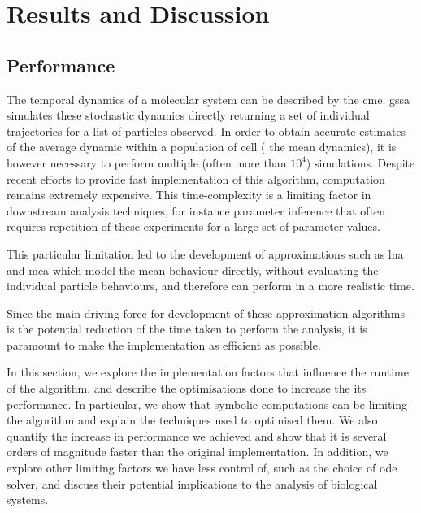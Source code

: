 \section{Results and Discussion} \label{results}



\subsection{Performance}\label{performance}
The temporal dynamics of a molecular system can be described by the \acrfull{cme}.
\acrfull{gssa}\cite{gillespie_general_1976} simulates these stochastic dynamics directly returning a set of individual trajectories for a list of particles observed.
In order to obtain accurate estimates of the average dynamic within a population of cell (\ie{} the mean dynamics), it is however necessary to perform multiple (often more than $10^4$) simulations.
Despite recent efforts \cite{niemi_efficient_2011,dittamo_optimized_2009,komarov_accelerating_2012} to provide fast implementation of this algorithm, computation remains extremely expensive. 
This time-complexity is a limiting factor in downstream analysis techniques, for
instance parameter inference that often requires repetition of these experiments for a large set of parameter values.

This particular limitation led to the development of approximations such as \acrfull{lna}\cite{komorowski_bayesian_2009} and \acrfull{mea}\cite{ale_general_2013}
 which model the mean behaviour directly, without evaluating the individual particle behaviours, and therefore can perform in a more realistic time.

Since the main driving force for development of these approximation algorithms is the potential reduction of the time taken to perform the analysis, 
it is paramount to make the implementation as efficient as possible.

In this section, we explore the implementation factors that influence the runtime of the algorithm, and describe the optimisations done to increase the its performance.
In particular, we show that symbolic computations can be limiting the algorithm and explain the techniques used to optimised them.
We also quantify the increase in performance we achieved and show that it is several orders of magnitude faster than the original \mat{} implementation.
In addition, we explore other limiting factors we have less control of, such as the choice of \gls{ode} solver, and discuss their potential implications to the analysis of biological systems.

